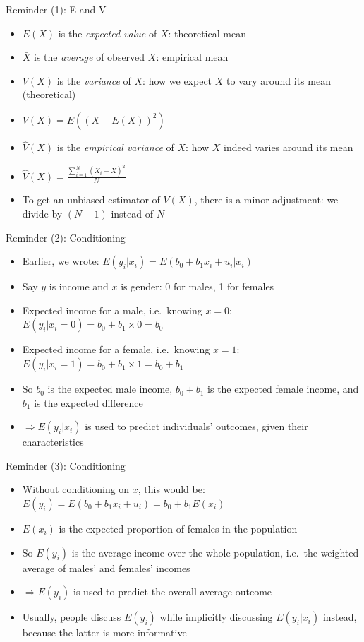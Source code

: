\documentclass[aspectratio=169]{beamer}
\begin{document}
\begin{frame}{Reminder (1): E and V}
\begin{itemize}
    \item $E(X)$ is the \textit{expected value} of $X$: theoretical mean
    \item $\bar{X}$ is the \textit{average} of observed $X$: empirical mean
    \item $V(X)$ is the \textit{variance} of $X$: how we expect $X$ to vary around its mean (theoretical)
    \item $V(X) = E((X - E(X))^2)$
    \item $\hat{V}(X)$ is the \textit{empirical variance} of $X$: how $X$ indeed varies around its mean
    \item $\hat{V}(X) = \frac{\sum_{i=1}^{N}(X_i - \bar{X})^2}{N}$
    \item To get an unbiased estimator of $V(X)$, there is a minor adjustment: we divide by $(N-1)$ instead of $N$
\end{itemize}
\end{frame}

\begin{frame}{Reminder (2): Conditioning}
\begin{itemize}
    \item Earlier, we wrote: $E(y_i|x_i) = E(b_0 + b_1x_i + u_i|x_i)$
    \item Say $y$ is income and $x$ is gender: 0 for males, 1 for females
    \item Expected income for a male, i.e.\ knowing $x = 0$:\\
    $E(y_i|x_i = 0) = b_0 + b_1 \times 0 = b_0$
    \item Expected income for a female, i.e.\ knowing $x = 1$:\\
    $E(y_i|x_i = 1) = b_0 + b_1 \times 1 = b_0 + b_1$
    \item So $b_0$ is the expected male income, $b_0 + b_1$ is the expected female income, and $b_1$ is the expected difference
    \item $\Rightarrow E(y_i|x_i)$ is used to predict individuals' outcomes, given their characteristics
\end{itemize}
\end{frame}

\begin{frame}{Reminder (3): Conditioning}
\begin{itemize}
    \item Without conditioning on $x$, this would be:\\
    $E(y_i) = E(b_0 + b_1x_i + u_i) = b_0 + b_1E(x_i)$
    \item $E(x_i)$ is the expected proportion of females in the population
    \item So $E(y_i)$ is the average income over the whole population, i.e.\ the weighted average of males' and females' incomes
    \item $\Rightarrow E(y_i)$ is used to predict the overall average outcome
    \item Usually, people discuss $E(y_i)$ while implicitly discussing $E(y_i|x_i)$ instead, because the latter is more informative
\end{itemize}
\end{frame}
\end{document}
